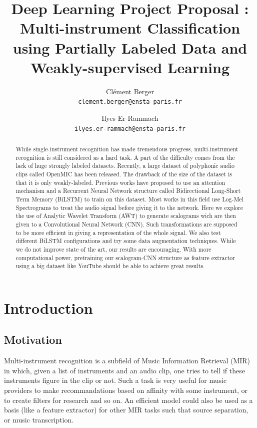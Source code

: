 \documentclass[final]{cvpr}
\begin{document}
\title{Deep Learning Project Proposal : Multi-instrument Classification using Partially Labeled Data and Weakly-supervised Learning}

\author{
	Clément Berger\\
	{\tt\small clement.berger@ensta-paris.fr}
\and Ilyes Er-Rammach\\
{\tt\small ilyes.er-rammach@ensta-paris.fr}

}

\maketitle
\begin{abstract}
	While single-instrument recognition has made tremendous progress, multi-instrument recognition is still considered as a hard task. A part of the difficulty comes from the lack of huge strongly labeled datasets. Recently, a large dataset of polyphonic audio clips called OpenMIC has been released. The drawback of the size of the dataset is that it is only weakly-labeled. Previous works have proposed to use an attention mechanism and a Recurrent Neural Network structure called Bidirectional Long-Short Term Memory (BiLSTM) to train on this dataset. Most works in this field use Log-Mel Spectrograms to treat the audio signal before giving it to the network. Here we explore the use of Analytic Wavelet Transform (AWT) to generate scalograms wich are then given to a Convolutional Neural Network (CNN). Such transformations are supposed to be more efficient in giving a representation of the whole signal. We also test different BiLSTM configurations and try some data augmentation techniques. While we do not improve state of the art, our results are encouraging. With more computational power, pretraining our scalogram-CNN structure as feature extractor using a big dataset like YouTube should be able to achieve great results.
\end{abstract}
\section{Introduction}
\subsection{Motivation}
Multi-instrument recognition is a subfield of Music Information Retrieval (MIR) in which, given a list of instruments and an audio clip, one tries to tell if these instruments figure in the clip or not. Such a task is very useful for music providers to make recommandations based on affinity with some instrument, or to create filters for research and so on. An efficient model could also be used as a basis (like a feature extractor) for other MIR tasks such that source separation, or music transcription.
\end{document}
